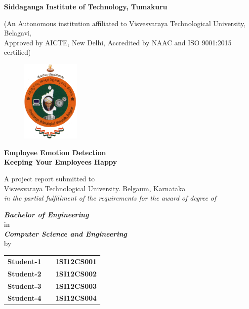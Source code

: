 
\begin{titlingpage}

\thispagestyle{empty}
\centering

\setlength{\toptafiddle}{1in}
\setlength{\bottafiddle}{1in}

\vspace*{-0.75in}
\enlargethispage{\toptafiddle}

\begin{LARGE}
\textbf{Siddaganga Institute of Technology, Tumakuru}\\
\end{LARGE}

\begin{small}

(An Autonomous institution affiliated to Visvesvaraya Technological University, Belagavi,\\ Approved by AICTE, New Delhi, Accredited by NAAC and ISO 9001:2015 certified)
\end{small}

\begin{figure}[h]
    \centering
    \includegraphics[height=4cm]{images/vtu.png}
\end{figure}

\vfill
\Huge{\textbf{\textcolor{therablue}{Employee Emotion Detection}}}\\
\Large{\textbf{Keeping Your Employees Happy}}
\vfill

\begin{small}
A project report submitted to \\Visvesvaraya Technological University. Belgaum, Karnataka \\
\textit{in the partial fulfillment of the requirements for the award of degree of} \\
\end{small}
\begin{normalsize}
\textbf{\textit{Bachelor of Engineering }} \\
in \\
\textbf{\textit{Computer Science and Engineering}} \\
by \\
\end{normalsize}
\vfill
\begin{tabular}{ccc}
\textbf{Student-1 }&  & \textbf{1SI12CS001}\\
\textbf{Student-2 }&  & \textbf{1SI12CS002}\\
\textbf{Student-3 }&  & \textbf{1SI12CS003}\\
\textbf{Student-4 }&  & \textbf{1SI12CS004}\\
\end{tabular}
\vfill


\end{titlingpage}
